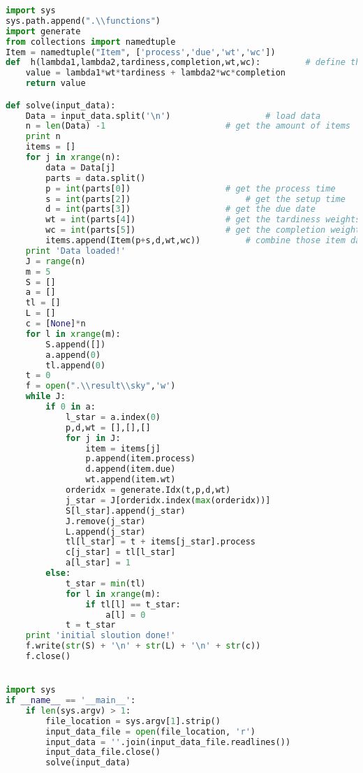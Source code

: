 \begin{lstlisting}[language = Python]
import sys
sys.path.append(".\\functions")
import generate
from collections import namedtuple
Item = namedtuple("Item", ['process','due','wt','wc'])
def  h(lambda1,lambda2,tardiness,completion,wt,wc):			# define the contribution of one item for the obj function
	value = lambda1*wt*tardiness + lambda2*wc*completion
	return value

def solve(input_data):
	Data = input_data.split('\n')					# load data
	n = len(Data) -1						# get the amount of items
	print n
	items = []
	for j in xrange(n):
		data = Data[j]
		parts = data.split()
		p = int(parts[0])					# get the process time
		s = int(parts[2])						# get the setup time
		d = int(parts[3])					# get the due date
		wt = int(parts[4])					# get the tardiness weights
		wc = int(parts[5])					# get the completion weights
		items.append(Item(p+s,d,wt,wc))			# combine those item data
	print 'Data loaded!'
	J = range(n)
	m = 5
	S = []
	a = []
	tl = []
	L = []
	c = [None]*n
	for l in xrange(m):
		S.append([])
		a.append(0)
		tl.append(0)
	t = 0
	f = open(".\\result\\sky",'w')
	while J:
		if 0 in a:
			l_star = a.index(0)
			p,d,wt = [],[],[]
			for j in J:				
				item = items[j]
				p.append(item.process)
				d.append(item.due)
				wt.append(item.wt)
			orderidx = generate.Idx(t,p,d,wt)
			j_star = J[orderidx.index(max(orderidx))]
			S[l_star].append(j_star)
			J.remove(j_star)
			L.append(j_star)
			tl[l_star] = t + items[j_star].process
			c[j_star] = tl[l_star]
			a[l_star] = 1
		else:
			t_star = min(tl)
			for l in xrange(m):
				if tl[l] == t_star:
					a[l] = 0
			t = t_star
	print 'initial sloution done!'
	f.write(str(S) + '\n' + str(L) + '\n' + str(c))
	f.close()


import sys
if __name__ == '__main__':
	if len(sys.argv) > 1:
		file_location = sys.argv[1].strip()
		input_data_file = open(file_location, 'r')
		input_data = ''.join(input_data_file.readlines())
		input_data_file.close()
		solve(input_data)
\end{lstlisting}